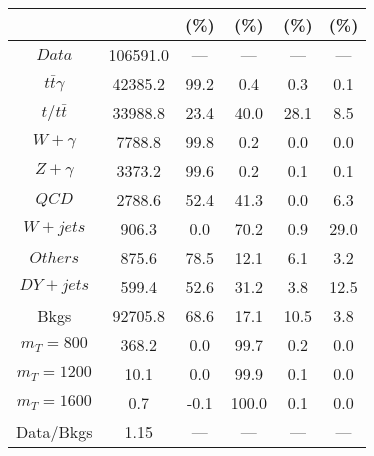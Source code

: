 \begin{figure}
\begin{minipage}[c]{0.32\textwidth}
{\begin{tabular}{cccccc}
 &  & (\%) & (\%) & (\%) & (\%)  \\
\hline
                                                                      $ Data $ &  106591.0 &  --- &  --- &  --- &  ---\\
$ t\bar{t}\gamma $ &  42385.2 &  99.2 &  0.4 &  0.3 &  0.1\\
$ t/t\bar{t} $ &  33988.8 &  23.4 &  40.0 &  28.1 &  8.5\\
$ W+\gamma $ &  7788.8 &  99.8 &  0.2 &  0.0 &  0.0\\
$ Z+\gamma $ &  3373.2 &  99.6 &  0.2 &  0.1 &  0.1\\
$ QCD $ &  2788.6 &  52.4 &  41.3 &  0.0 &  6.3\\
$ W+jets $ &  906.3 &  0.0 &  70.2 &  0.9 &  29.0\\
$ Others $ &  875.6 &  78.5 &  12.1 &  6.1 &  3.2\\
$ DY+jets $ &  599.4 &  52.6 &  31.2 &  3.8 &  12.5\\
Bkgs &  92705.8 &  68.6 &  17.1 &  10.5 &  3.8\\
$ m_{T} = 800 $ &  368.2 &  0.0 &  99.7 &  0.2 &  0.0\\
$ m_{T} = 1200 $ &  10.1 &  0.0 &  99.9 &  0.1 &  0.0\\
$ m_{T} = 1600 $ &  0.7 &  -0.1 &  100.0 &  0.1 &  0.0\\
Data/Bkgs &  1.15 &  --- &  --- &  --- &  ---\\
\hline
\end{tabular}
}
\end{minipage}
\end{figure}

